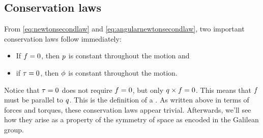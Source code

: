 \subsection{Conservation laws}
%
From \cref{eq:newtonsecondlaw} and \cref{eq:angularnewtonsecondlaw}, two important conservation laws follow immediately:
%
\begin{itemize}
%
\item If $f = 0$, then $p$ is constant throughout the motion and
%
\item if $\tau = 0$, then $\phi$ is constant throughout the motion.
%
\end{itemize}
%
Notice that $\tau = 0$ does not require $f = 0$, but only $q\times f = 0$. This means that $f$ must be parallel to $q$. This is the definition of a . As written above in terms of forces and torques, these conservation laws appear trivial. Afterwards, we'll see how they arise as a property of the symmetry of space as encoded in the Galilean group.


